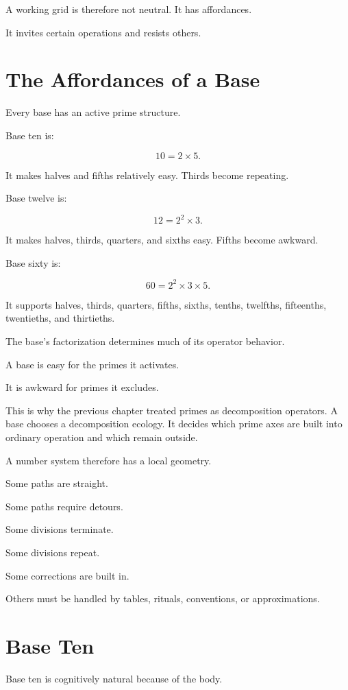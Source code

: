 \documentclass[11pt]{book}
\begin{document}
A working grid is therefore not neutral. It has affordances.

It invites certain operations and resists others.

\section{The Affordances of a Base}

Every base has an active prime structure.

Base ten is:

\[
10 = 2 \times 5.
\]

It makes halves and fifths relatively easy. Thirds become repeating.

Base twelve is:

\[
12 = 2^2 \times 3.
\]

It makes halves, thirds, quarters, and sixths easy. Fifths become awkward.

Base sixty is:

\[
60 = 2^2 \times 3 \times 5.
\]

It supports halves, thirds, quarters, fifths, sixths, tenths, twelfths, fifteenths, twentieths, and thirtieths.

The base's factorization determines much of its operator behavior.

A base is easy for the primes it activates.

It is awkward for primes it excludes.

This is why the previous chapter treated primes as decomposition operators. A base chooses a decomposition ecology. It decides which prime axes are built into ordinary operation and which remain outside.

A number system therefore has a local geometry.

Some paths are straight.

Some paths require detours.

Some divisions terminate.

Some divisions repeat.

Some corrections are built in.

Others must be handled by tables, rituals, conventions, or approximations.

\section{Base Ten}

Base ten is cognitively natural because of the body.
\end{document}
